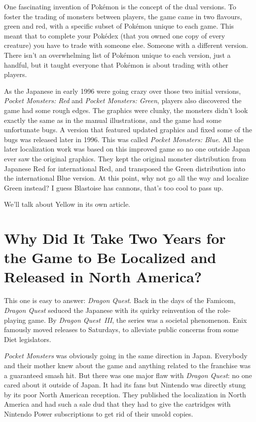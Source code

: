 \documentclass{book}
\begin{document}
One fascinating invention of Pokémon is the concept of the dual versions. To foster the trading of monsters between players, the game came in two flavours, green and red, with a specific subset of Pokémon unique to each game. This meant that to complete your Pokédex (that you owned one copy of every creature) you have to trade with someone else. Someone with a different version. There isn’t an overwhelming list of Pokémon unique to each version, just a handful, but it taught everyone that Pokémon is about trading with other players.\par
As the Japanese in early 1996 were going crazy over those two initial versions, \emph{Pocket Monsters: Red} and \emph{Pocket Monsters: Green}, players also discovered the game had some rough edges. The graphics were clunky, the monsters didn’t look exactly the same as in the manual illustrations, and the game had some unfortunate bugs. A version that featured updated graphics and fixed some of the bugs was released later in 1996. This was called \emph{Pocket Monsters: Blue}. All the later localization work was based on this improved game so no one outside Japan ever saw the original graphics. They kept the original monster distribution from Japanese Red for international Red, and transposed the Green distribution into the international Blue version. At this point, why not go all the way and localize Green instead? I guess Blastoise has cannons, that’s too cool to pass up.\par
We’ll talk about Yellow in its own article.\par
\FloatBarrier\section*{Why Did It Take Two Years for the Game to Be Localized and Released in North America?}
This one is easy to answer: \emph{Dragon Quest}. Back in the days of the Famicom, \emph{Dragon Quest} seduced the Japanese with its quirky reinvention of the role-playing game. By \emph{Dragon Quest~III}, the series was a societal phenomenon. Enix famously moved releases to Saturdays, to alleviate public concerns from some Diet legislators.\par
\emph{Pocket Monsters} was obviously going in the same direction in Japan. Everybody and their mother knew about the game and anything related to the franchise was a guaranteed smash hit. But there was one major flaw with \emph{Dragon Quest}: no one cared about it outside of Japan. It had its fans but Nintendo was directly stung by its poor North American reception. They published the localization in North America and had such a sale dud that they had to give the cartridges with Nintendo Power subscriptions to get rid of their unsold copies.\par
\end{document}
